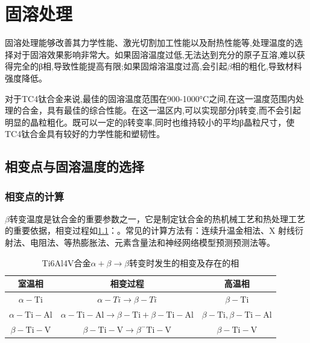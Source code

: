 \documentclass[
class = book,
zihao = -4,
font = noto,
paper = a4paper,
openany
]{easybook}
\newcommand{\ti}{Ti6Al4V}
\begin{document}
\chapter{固溶处理}
固溶处理能够改善其力学性能、激光切割加工性能以及耐热性能等,处理温度的选择对于固溶效果影响非常大。如果固溶温度过低,无法达到充分的原子互溶,难以获得完全的β相,导致性能提高有限;如果固熔溶温度过高,会引起$ \beta $相的粗化,导致材料强度降低。

对于TC4钛合金来说,最佳的固溶温度范围在900-1000°C之间,在这一温度范围内处理的合金，具有最佳的综合性能。在这一温区内,可以实现部分β转变,而不会引起明显的晶粒粗化。既可以一定的β转变率,同时也维持较小的平均β晶粒尺寸，使TC4钛合金具有较好的力学性能和塑韧性。

\section{相变点与固溶温度的选择}
\subsection{相变点的计算}
$\beta$转变温度是钛合金的重要参数之一，它是制定钛合金的热机械工艺和热处理工艺的重要依据，相变过程如\ref{sec:Tc4betachange}：。常见的计算方法\cite{zhuhongTaihejinaVxiangbiandiandejizhongceshifangfatantao2013}有：连续升温金相法、X 射线衍射法、电阻法、等热膨胀法、元素含量法和神经网络模型预测预测法\cite{renchiqiangGurongshixiaoduiTC4taihejinxianweizuzhihelixuexingnengdeyingxiang2022}等。
\begin{table}[htbp]
	\centering
	\caption{\ti 合金$ \alpha+\beta \to \beta $转变时发生的相变及存在的相}
	\label{sec:Tc4betachange}
\begin{tabular}{ccc}
	\toprule 室温相 & 相变过程 & 高温相 \\
	\midrule$\alpha-\mathrm{Ti}$ & $\alpha-T i \rightarrow \beta-T i$ & $\beta-\mathrm{Ti}$ \\
	$\alpha-\mathrm{Ti}-\mathrm{Al}$ & $\alpha-\mathrm{Ti}-\mathrm{Al} \rightarrow \beta-\mathrm{Ti}+\beta-\mathrm{Ti}-\mathrm{Al}$ & $\beta-\mathrm{Ti}, \beta-\mathrm{Ti}-\mathrm{Al}$ \\
	$\beta- \mathrm{Ti}-\mathrm{V}$ & $\beta-\mathrm{Ti}-\mathrm{V} \rightarrow \beta^{-} \mathrm{Ti}-\mathrm{V}$ & $\beta-\mathrm{Ti}-\mathrm{V}$ \\
	\bottomrule
\end{tabular}
\end{table}
\end{document}
